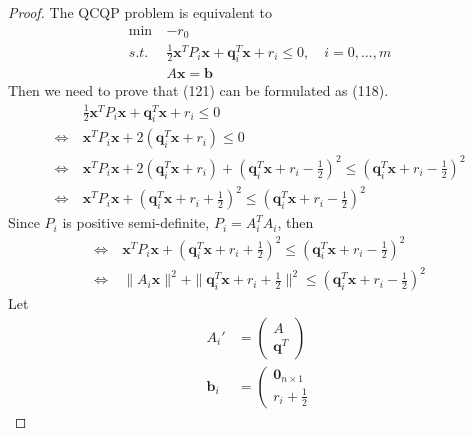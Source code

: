 \begin{proof}
    The QCQP problem is equivalent to
    \begin{align}
        \min \ & - r_0 \\
        s.t. \ &\frac{1}{2} \mathbf{x}^T P_i \mathbf{x}
        + \mathbf{q}_i^T \mathbf{x} + r_i \leq 0, \quad i = 0,...,m \\
        & A \mathbf{x} = \mathbf{b}
    \end{align}
    Then we need to prove that (121) can be formulated as (118).
    \begin{align}
        &\frac{1}{2} \mathbf{x}^T P_i \mathbf{x}
        + \mathbf{q}_i^T \mathbf{x} + r_i \leq 0 \\
        \Leftrightarrow \ & \mathbf{x}^T P_i \mathbf{x}
        + 2(\mathbf{q}_i^T \mathbf{x} + r_i) \leq 0 \\
        \Leftrightarrow \ & \mathbf{x}^T P_i \mathbf{x}
        + 2(\mathbf{q}_i^T \mathbf{x} + r_i)
        + (\mathbf{q}_i^T \mathbf{x} + r_i - \frac{1}{2})^2
         \leq (\mathbf{q}_i^T \mathbf{x} + r_i - \frac{1}{2})^2 \\
         \Leftrightarrow \ & \mathbf{x}^T P_i \mathbf{x}
         + (\mathbf{q}_i^T \mathbf{x} + r_i + \frac{1}{2})^2
          \leq (\mathbf{q}_i^T \mathbf{x} + r_i - \frac{1}{2})^2
    \end{align}
    Since $P_i$ is positive semi-definite, $P_i = A_i^TA_i$, then
    \begin{align}
        \Leftrightarrow \ & \mathbf{x}^T P_i \mathbf{x}
        + (\mathbf{q}_i^T \mathbf{x} + r_i + \frac{1}{2})^2
         \leq (\mathbf{q}_i^T \mathbf{x} + r_i - \frac{1}{2})^2 \\
         \Leftrightarrow \ & \parallel A_i \mathbf{x} \parallel^2
         + \parallel \mathbf{q}_i^T \mathbf{x} + r_i + \frac{1}{2}\parallel^2
          \leq (\mathbf{q}_i^T \mathbf{x} + r_i - \frac{1}{2})^2 
    \end{align}
    Let
    \begin{align}
        A_i' &= \left(
            \begin{array}{ll}
                A \\
                \mathbf{q}^T
            \end{array}\right) \\
            \mathbf{b}_i &= \left(
                \begin{array}{ll}
                    \mathbf{0}_{n\times1} \\
                    r_i + \frac{1}{2}

\end{array}
\end{align}
\end{proof}
